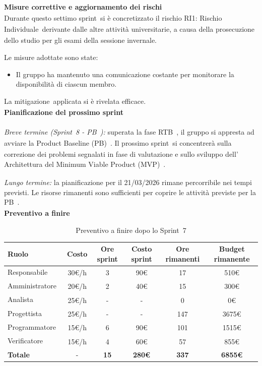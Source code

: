 \documentclass[a4paper,12pt]{article}
\newcommand{\pediceG}{\texorpdfstring{\textsubscript{\scalebox{0.6}{\textbf{G}}}~}{G}}
\begin{document}
\noindent\textbf{Misure correttive e aggiornamento dei rischi\pediceG}\\
Durante questo settimo sprint\pediceG si è concretizzato il rischio RI1: Rischio Individuale\pediceG derivante dalle altre attività universitarie, a causa della prosecuzione dello studio per gli esami della sessione invernale.

Le misure adottate sono state:
\begin{itemize}
    \item Il gruppo ha mantenuto una comunicazione costante per monitorare la disponibilità di ciascun membro.
\end{itemize}

La mitigazione\pediceG applicata si è rivelata efficace.\\

\noindent\textbf{Pianificazione del prossimo sprint}\\\\
\textit{Breve termine (Sprint\pediceG 8 - PB\pediceG):} superata la fase RTB\pediceG, il gruppo si appresta ad avviare la Product Baseline (PB)\pediceG. Il prossimo sprint\pediceG si concentrerà sulla correzione dei problemi segnalati in fase di valutazione e sullo sviluppo dell' Architettura del Minimum Viable Product (MVP)\pediceG.

\textit{Lungo termine:} la pianificazione per il 21/03/2026 rimane percorribile nei tempi previsti. Le risorse rimanenti sono sufficienti per coprire le attività previste per la PB\pediceG.\\

\noindent\textbf{Preventivo a finire}

\begin{table}[H]
\centering
\footnotesize
\begin{tabular}{|l|c|c|c|c|c|}
\hline
Ruolo & Costo & Ore sprint & Costo sprint & Ore rimanenti & Budget rimanente \\
\hline
Responsabile\pediceG & 30€/h & 3 & 90€ & 17 & 510€ \\
\hline
Amministratore\pediceG & 20€/h & 2 & 40€ & 15 & 300€ \\
\hline
Analista\pediceG & 25€/h & - & - & 0 & 0€ \\
\hline
Progettista\pediceG & 25€/h & - & - & 147 & 3675€ \\
\hline
Programmatore\pediceG & 15€/h & 6 & 90€ & 101 & 1515€ \\
\hline
Verificatore\pediceG & 15€/h & 4 & 60€ & 57 & 855€ \\
\hline
\textbf{Totale} & - & \textbf{15} & \textbf{280€} & \textbf{337} & \textbf{6855€} \\
\hline
\end{tabular}
\caption{Preventivo a finire dopo lo Sprint\pediceG 7}
\label{tab:risorse-sprint7}
\end{table}
\end{document}
